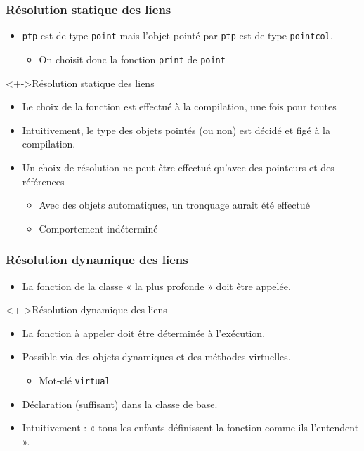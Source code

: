 \begin{frame}
\frametitle{Résolution statique des liens}
\begin{itemize}[<+->]
\item \texttt{ptp} est de type \texttt{point} mais l'objet pointé par \texttt{ptp} est de type \texttt{pointcol}.
	\begin{itemize}
	\item On choisit donc la fonction \texttt{print} de \texttt{point}
	\end{itemize}
\end{itemize}
\begin{exampleblock}<+->{Résolution statique des liens}
	\begin{itemize}[<+->]
	\item Le choix de la fonction est effectué à la compilation, une fois pour toutes
	\end{itemize}
\end{exampleblock}
\begin{itemize}[<+->]
\item Intuitivement, le type des objets pointés (ou non) est décidé et figé à la compilation.
\item Un choix de résolution ne peut-être effectué qu'avec des pointeurs et des références
	\begin{itemize}
	\item Avec des objets automatiques, un tronquage aurait été effectué
	\item Comportement indéterminé
	\end{itemize}
\end{itemize}
\end{frame}

\begin{frame}
\frametitle{Résolution dynamique des liens}
\begin{itemize}[<+->]
\item La fonction de la classe « la plus profonde » doit être appelée.
\end{itemize}
\begin{exampleblock}<+->{Résolution dynamique des liens}
	\begin{itemize}[<+->]
	\item La fonction à appeler doit être déterminée à l'exécution.
	\end{itemize}
\end{exampleblock}
\begin{itemize}[<+->]
\item Possible via des objets dynamiques et des méthodes virtuelles.
	\begin{itemize}
	\item Mot-clé \lstinline|virtual|
	\end{itemize}
\item Déclaration (suffisant) dans la classe de base.
\item Intuitivement : « tous les enfants définissent la fonction comme ils l'entendent ».
\end{itemize}
\end{frame}

